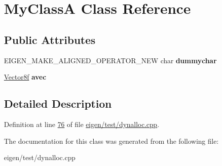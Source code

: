 \hypertarget{class_my_class_a}{}\section{My\+ClassA Class Reference}
\label{class_my_class_a}
\subsection*{Public Attributes}
\begin{DoxyCompactItemize}
\item 
\mbox{\label{class_my_class_a_ad27d0c9f3e641c2a4cb93fa85f6d29a6}} 
E\+I\+G\+E\+N\+\_\+\+M\+A\+K\+E\+\_\+\+A\+L\+I\+G\+N\+E\+D\+\_\+\+O\+P\+E\+R\+A\+T\+O\+R\+\_\+\+N\+EW char {\bfseries dummychar}
\item 
\mbox{\label{class_my_class_a_a5a589dff67370870abb598ebbbbc8248}} 
\hyperlink{group___core___module}{Vector8f} {\bfseries avec}
\end{DoxyCompactItemize}


\subsection{Detailed Description}


Definition at line \hyperlink{eigen_2test_2dynalloc_8cpp_source_l00076}{76} of file \hyperlink{eigen_2test_2dynalloc_8cpp_source}{eigen/test/dynalloc.\+cpp}.



The documentation for this class was generated from the following file\+:\begin{DoxyCompactItemize}
\item 
eigen/test/dynalloc.\+cpp\end{DoxyCompactItemize}
